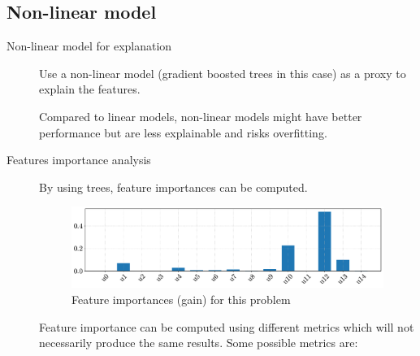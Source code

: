 \subsection{Non-linear model}

\begin{description}
    \item[Non-linear model for explanation] 
        Use a non-linear model (gradient boosted trees in this case) as a proxy to explain the features.

        \begin{remark}
            Compared to linear models, non-linear models might have better performance but are less explainable and risks overfitting.
        \end{remark}

    \item[Features importance analysis]
        By using trees, feature importances can be computed.

        \begin{figure}[H]
            \centering
            \includegraphics[width=0.85\linewidth]{./img/_biomed_gbt_importance.pdf}
            \caption{Feature importances (gain) for this problem}
        \end{figure}

        \begin{remark}
            Feature importance can be computed using different metrics which will not necessarily produce the same results. Some possible metrics are:


\end{remark}
\end{description}
